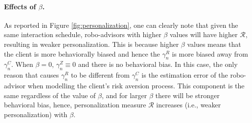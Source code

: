 \paragraph{Effects of $\beta$.} As reported in Figure \ref{fig:personalization}, one can clearly note that given the same interaction schedule, robo-advisors with higher $\beta$ values will have higher $\mathcal R$, resulting in weaker personalization. This is because higher $\beta$ values means that the client is more behaviorally biased and hence the $\gamma_n^R$ is more biased away from $\gamma_n^C$. When $\beta=0$, $\gamma_n^Z\equiv0$ and there is no behavioral bias. In this case, the only reason that causes $\gamma_n^R$ to be different from $\gamma_n^C$ is the estimation error of the robo-advisor when modelling the client's risk aversion process. This component is the same regardless of the value of $\beta$, and for larger $\beta$ there will be stronger behavioral bias, hence, personalization measure $\mathcal R$ increases (i.e., weaker personalization) with $\beta$.

